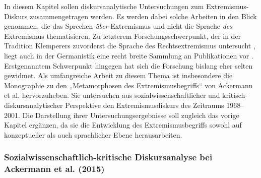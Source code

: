 In diesem Kapitel sollen diskursanalytische Untersuchungen zum Extremismus-Diskurs zusammengetragen werden. Es werden dabei solche Arbeiten in den Blick genommen, die das Sprechen \emph{über} Extremismus und nicht die Sprache \emph{des} Extremismus thematisieren. Zu letzterem Forschungsschwerpunkt, der in der Tradition Klemperers \autocite*{klempererLTINotizbuchPhilologen1947} zuvorderst die Sprache des Rechtsextremismus untersucht \autocite[siehe aber zu einer Extremismusvarianten vergleichenden linguistischen Analyse][]{eblingGibtEsSprache2013}, liegt auch in der Germanistik eine recht breite Sammlung an Publikationen vor \autocites[nur exemplarisch seien genannt][]{meier-vierackerRacistDiscourseGerman2024, kaemperImNationalsozialismusPraktiken2022, scharlothHaesslicheWoerterHatespeech2021, bubenhoferPolitisierungRechtspopulistischenMedien2019, wodakDiscourseRacism2015}. Erstgenanntem Schwerpunkt hingegen hat sich die Forschung bislang eher selten gewidmet. Als umfangreiche Arbeit zu diesem Thema ist insbesondere die Monographie zu den „Metamorphosen des Extremismusbegriffs`` von Ackermann et al. \autocite*{ackermannMetamorphosenExtremismusbegriffesDiskursanalytische2015} hervorzuheben. Sie untersuchen aus sozialwissenschaftlicher und kritisch-diskursanalytischer Perspektive den Extremismusdiskurs des Zeitraums 1968--2001. Die Darstellung ihrer Untersuchungsergebnisse soll zugleich das vorige Kapitel ergänzen, da sie die Entwicklung des Extremismusbegriffs sowohl auf konzeptueller als auch sprachlicher Ebene herausarbeiten.

\subsubsection{Sozialwissenschaftlich-kritische Diskursanalyse bei Ackermann et al. (2015)}\label{sozialwissenschaftlich-kritische-diskursanalyse-bei-ackermann-et-al.-2015}

